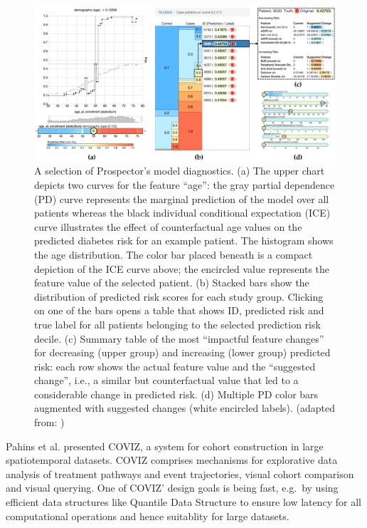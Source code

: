 \documentclass[
  oneside]{book}
\begin{document}
\begin{figure}

{\centering \includegraphics[width=1\linewidth]{figures/03-prospector} 

}

\caption{A selection of Prospector's model diagnostics. (a) The upper chart depicts two curves for the feature ``age'': the gray partial dependence (PD) curve represents the marginal prediction of the model over all patients whereas the black individual conditional expectation (ICE) curve illustrates the effect of counterfactual age values on the predicted diabetes risk for an example patient. The histogram shows the age distribution. The color bar placed beneath is a compact depiction of the ICE curve above; the encircled value represents the feature value of the selected patient. (b) Stacked bars show the distribution of predicted risk scores for each study group. Clicking on one of the bars opens a table that shows ID, predicted risk and true label for all patients belonging to the selected prediction risk decile. (c) Summary table of the most ``impactful feature changes'' for decreasing (upper group) and increasing (lower group) predicted risk: each row shows the actual feature value and the ``suggested change'', i.e., a similar but counterfactual value that led to a considerable change in predicted risk. (d) Multiple PD color bars augmented with suggested changes (white encircled labels). (adapted from: \autocite{Krause:Prospector2016})}\label{fig:03-prospector}
\end{figure}

Pahins et al. \autocite{Pahins:COVIZ2019} presented COVIZ, a system for cohort construction in large spatiotemporal datasets.
COVIZ comprises mechanisms for explorative data analysis of treatment pathways and event trajectories, visual cohort comparison and visual querying.
One of COVIZ' design goals is being fast, e.g.~by using efficient data structures like Quantile Data Structure \autocite{de2019real} to ensure low latency for all computational operations and hence suitablity for large datasets.
\end{document}
